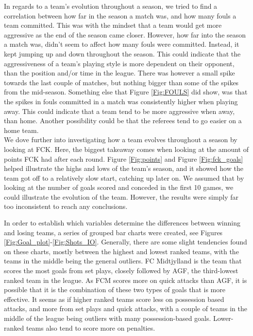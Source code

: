 \documentclass[Report.tex]{subfiles}
\begin{document}
In regards to a team's evolution throughout a season, we tried to find a correlation between how far in the season a match was, and how many fouls a team committed.
This was with the mindset that a team would get more aggressive as the end of the season came closer. However, how far into the season a match was, didn't seem to affect how many fouls were committed. Instead, it kept jumping up and down throughout the season. This could indicate that the aggressiveness of a team's playing style is more dependent on their opponent, than the position and/or time in the league. There was however a small spike towards the last couple of matches, but nothing bigger than some of the spikes from the mid-season. Something else that Figure \ref{Fig:FOULS} did show, was that the spikes in fouls committed in a match was consistently higher when playing away. This could indicate that a team tend to be more aggressive when away, than home. Another possibility could be that the referees tend to go easier on a home team.
\\

We dove further into investigating how a team evolves throughout a season by looking at FCK. Here, the biggest takeaway comes when looking at the amount of points FCK had after each round. Figure \ref{Fig:points} and Figure \ref{Fig:fck_goals} helped illustrate the highs and lows of the team’s season, and it showed how the team got off to a relatively slow start, catching up later on. We assumed that by looking at the number of goals scored and conceded in the first 10 games, we could illustrate the evolution of the team. However, the results were simply far too inconsistent to reach any conclusions. 

In order to establish which variables determine the differences between
winning and losing teams, a series of grouped bar charts were created, see
Figures \ref{Fig:Goal_plot}-\ref{Fig:Shots_IO}.
Generally, there are some slight tendencies found on these charts, mostly between the highest and lowest ranked teams, with the teams in the middle being the general outliers. 
FC Midtjylland is the team that scores the most goals from set plays, closely followed by AGF, the third-lowest ranked team in the league. As FCM scores more on quick attacks than AGF, it is possible that it is the combination of these two types of goals that is more effective. It seems as if higher ranked teams score less on possession based attacks, and more from set plays and quick attacks, with a couple of teams in the middle of the league being outliers with many possession-based goals. Lower-ranked teams also tend to score more on penalties. 
\end{document}
